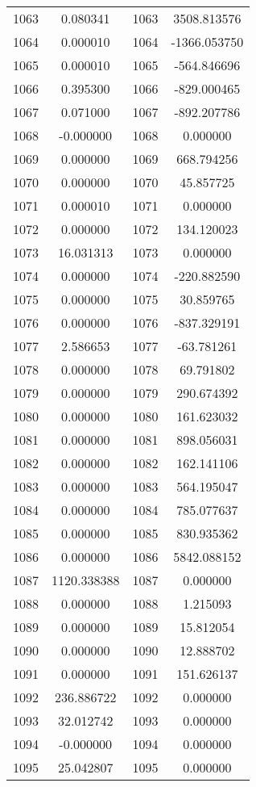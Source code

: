 \documentclass[12pt]{article}
\begin{document}
\begin{longtable}{@{}cccc@{}}
1063 & 0.080341 & 1063 & 3508.813576 \\
1064 & 0.000010 & 1064 & -1366.053750 \\
1065 & 0.000010 & 1065 & -564.846696 \\
1066 & 0.395300 & 1066 & -829.000465 \\
1067 & 0.071000 & 1067 & -892.207786 \\
1068 & -0.000000 & 1068 & 0.000000 \\
1069 & 0.000000 & 1069 & 668.794256 \\
1070 & 0.000000 & 1070 & 45.857725 \\
1071 & 0.000010 & 1071 & 0.000000 \\
1072 & 0.000000 & 1072 & 134.120023 \\
1073 & 16.031313 & 1073 & 0.000000 \\
1074 & 0.000000 & 1074 & -220.882590 \\
1075 & 0.000000 & 1075 & 30.859765 \\
1076 & 0.000000 & 1076 & -837.329191 \\
1077 & 2.586653 & 1077 & -63.781261 \\
1078 & 0.000000 & 1078 & 69.791802 \\
1079 & 0.000000 & 1079 & 290.674392 \\
1080 & 0.000000 & 1080 & 161.623032 \\
1081 & 0.000000 & 1081 & 898.056031 \\
1082 & 0.000000 & 1082 & 162.141106 \\
1083 & 0.000000 & 1083 & 564.195047 \\
1084 & 0.000000 & 1084 & 785.077637 \\
1085 & 0.000000 & 1085 & 830.935362 \\
1086 & 0.000000 & 1086 & 5842.088152 \\
1087 & 1120.338388 & 1087 & 0.000000 \\
1088 & 0.000000 & 1088 & 1.215093 \\
1089 & 0.000000 & 1089 & 15.812054 \\
1090 & 0.000000 & 1090 & 12.888702 \\
1091 & 0.000000 & 1091 & 151.626137 \\
1092 & 236.886722 & 1092 & 0.000000 \\
1093 & 32.012742 & 1093 & 0.000000 \\
1094 & -0.000000 & 1094 & 0.000000 \\
1095 & 25.042807 & 1095 & 0.000000 \\

\end{longtable}
\end{document}
